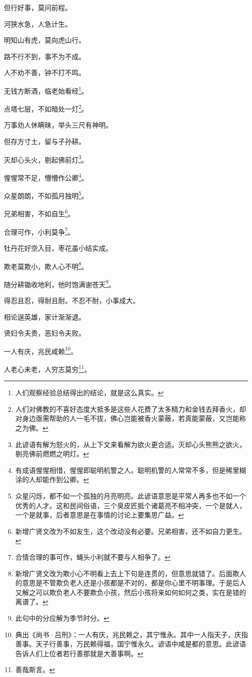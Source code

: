 \documentclass[12pt,oneside]{book}
\begin{document}
但行好事，莫问前程。

河狭水急，人急计生。

明知山有虎，莫向虎山行。

路不行不到，事不为不成。

人不劝不善，钟不打不鸣。

无钱方断酒，临老始看经\footnote{人们观察经验总结得出的结论，就是这么真实。}。

点塔七层，不如暗处一灯\footnote{人们对佛教的不喜好态度大抵多是这些人花费了太多精力和金钱去拜香火，却对身边亟需帮助的人一毛不拔，佛心岂能被香火蒙蔽，若真能蒙蔽，又岂能称之为佛。}。

万事劝人休瞒昧，举头三尺有神明。

但存方寸土，留与子孙耕。

灭却心头火，剔起佛前灯\footnote{此谚语有解为怒火的，从上下文来看解为欲火更合适。灭却心头熊熊之欲火，剔亮佛前燃燃之明灯。}。

惺惺常不足，懵懵作公卿\footnote{有成语惺惺相惜，惺惺即聪明机警之人。聪明机警的人常常不多，但是稀里糊涂的人却能作到公卿。}。

众星朗朗，不如孤月独明\footnote{众星闪烁，都不如一个孤独的月亮明亮。此谚语意思是平常人再多也不如一个优秀的人才。这和民间俗语，三个臭皮匠抵个诸葛亮不相冲突，一个是就人，一个是就事，后者意思是在事情的讨论上要集思广益。}。

兄弟相害，不如自生\footnote{新增广贤文改为不如友生，这个改动没有必要。兄弟相害，还不如自力更生。}。

合理可作，小利莫争\footnote{合情合理的事可作，蝇头小利就不要与人相争了。}。

牡丹花好空入目，枣花虽小结实成。

欺老莫欺小，欺人心不明\footnote{新增广贤文改为欺小心不明看上去上下句是连贯的，但意思就错了。后面欺人的意思是不管欺负老人还是小孩都是不对的，都是你心里不明事理。于是后人又解之可以欺负老人不要欺负小孩，然后小孩将来如何如何之类，实在是错的离谱了。}。

随分耕锄收地利，他时饱满谢苍天\footnote{此句中的分应解为季节时分。}。

得忍且忍，得耐且耐。不忍不耐，小事成大。

相论逞英雄，家计渐渐退。

贤妇令夫贵，恶妇令夫败。

一人有庆，兆民咸赖\footnote{典出《尚书·吕刑》：一人有庆，兆民赖之，其宁惟永。其中一人指天子，庆指善事。天子行善事，万民赖得福，国宁惟永久。谚语中咸是都的意思。此谚语告诉人们上位者若行善那就是大善事啊。}。

人老心未老，人穷志莫穷\footnote{善哉斯言。}。
\end{document}
